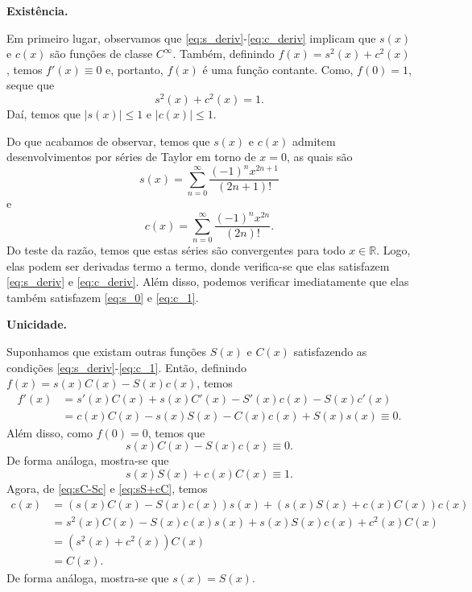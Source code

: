 \begin{flushleft}
  {\bf Existência.}
\end{flushleft}

Em primeiro lugar, observamos que \eqref{eq:s_deriv}-\eqref{eq:c_deriv} implicam que $s(x)$ e $c(x)$ são funções de classe $C^\infty$. Também, definindo $f(x)=s^2(x) + c^2(x)$, temos $f'(x)\equiv 0$ e, portanto, $f(x)$ é uma função contante. Como, $f(0)=1$, seque que
\begin{equation}
  s^2(x) + c^2(x) = 1.
\end{equation}
Daí, temos que $|s(x)|\leq 1$ e $|c(x)|\leq 1$.

Do que acabamos de observar, temos que $s(x)$ e $c(x)$ admitem desenvolvimentos por séries de Taylor em torno de $x=0$, as quais são
\begin{equation}\label{eq:ser_pot_seno}
  s(x) = \sum_{n=0}^\infty \frac{(-1)^nx^{2n+1}}{(2n+1)!}
\end{equation}
e
\begin{equation}\label{eq:ser_pot_cos}
  c(x) = \sum_{n=0}^\infty \frac{(-1)^nx^{2n}}{(2n)!}.
\end{equation}
Do teste da razão, temos que estas séries são convergentes para todo $x\in\mathbb{R}$. Logo, elas podem ser derivadas termo a termo, donde verifica-se que elas satisfazem \eqref{eq:s_deriv} e \eqref{eq:c_deriv}. Além disso, podemos verificar imediatamente que elas também satisfazem \eqref{eq:s_0} e \eqref{eq:c_1}.

\begin{flushleft}
  {\bf Unicidade.}
\end{flushleft}

Suponhamos que existam outras funções $S(x)$ e $C(x)$ satisfazendo as condições \eqref{eq:s_deriv}-\eqref{eq:c_1}. Então, definindo $f(x) = s(x)C(x)-S(x)c(x)$, temos
\begin{align}
  f'(x) &= s'(x)C(x)+s(x)C'(x)-S'(x)c(x)-S(x)c'(x)\\
  &= c(x)C(x)-s(x)S(x)-C(x)c(x)+S(x)s(x) \equiv 0.
\end{align}
Além disso, como $f(0)=0$, temos que
\begin{equation}\label{eq:sC-Sc}
  s(x)C(x)-S(x)c(x)\equiv 0.
\end{equation}
De forma análoga, mostra-se que
\begin{equation}\label{eq:sS+cC}
  s(x)S(x)+c(x)C(x)\equiv 1.
\end{equation}
Agora, de \eqref{eq:sC-Sc} e \eqref{eq:sS+cC}, temos
\begin{align}
  c(x) &= (s(x)C(x)-S(x)c(x))s(x)+(s(x)S(x)+c(x)C(x))c(x)\\
  &= s^2(x)C(x)-S(x)c(x)s(x)+s(x)S(x)c(x)+c^2(x)C(x)\\
  &= (s^2(x)+c^2(x))C(x)\\
  &= C(x).
\end{align}
De forma análoga, mostra-se que $s(x) = S(x)$.

